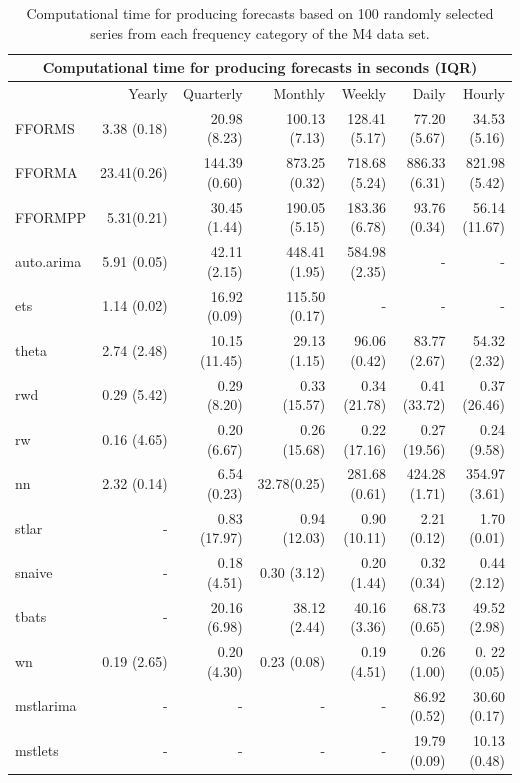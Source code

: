 \documentclass{monashthesis}
\begin{document}
\begin{table}[!h]
\centering\scriptsize\tabcolsep=0.12cm
\caption{Computational time for producing forecasts based on 100 randomly selected series from each frequency category of the M4 data set.}
\label{forecasttime}
{\color{black}\begin{tabular}{l|rrrrrr}
\hline
\multicolumn{7}{c}{Computational time for producing forecasts in seconds (IQR)} \\\hline
 & Yearly & Quarterly & Monthly & Weekly & Daily & Hourly \\\hline
FFORMS & 3.38 (0.18) & 20.98 (8.23)  &  100.13 (7.13) & 128.41 (5.17)  & 77.20 (5.67) & 34.53 (5.16) \\
FFORMA & 23.41(0.26) & 144.39 (0.60)& 873.25 (0.32) & 718.68 (5.24) & 886.33 (6.31) & 821.98 (5.42) \\
FFORMPP & 5.31(0.21) & 30.45 (1.44) & 190.05 (5.15) & 183.36 (6.78) & 93.76 (0.34) & 56.14 (11.67) \\\hline
auto.arima & 5.91 (0.05)  &  42.11 (2.15)& 448.41 (1.95) & 584.98 (2.35) &  -& - \\
ets & 1.14 (0.02) & 16.92 (0.09) & 115.50 (0.17) &  -&-  &  -\\
theta & 2.74 (2.48) & 10.15 (11.45) & 29.13 (1.15) & 96.06 (0.42) & 83.77 (2.67) & 54.32 (2.32) \\
rwd & 0.29 (5.42) & 0.29 (8.20) & 0.33 (15.57)  & 0.34 (21.78)  & 0.41 (33.72)  & 0.37 (26.46) \\
rw & 0.16 (4.65) & 0.20 (6.67) & 0.26 (15.68)   & 0.22 (17.16) &0.27 (19.56)  & 0.24 (9.58)\\
nn & 2.32 (0.14) & 6.54 (0.23) & 32.78(0.25) &281.68 (0.61) & 424.28 (1.71) & 354.97 (3.61) \\
stlar & - & 0.83 (17.97) & 0.94 (12.03) & 0.90 (10.11) & 2.21 (0.12) & 1.70 (0.01) \\
snaive & - & 0.18 (4.51) & 0.30 (3.12) & 0.20 (1.44) & 0.32 (0.34) & 0.44 (2.12) \\
tbats & - & 20.16 (6.98) & 38.12 (2.44) & 40.16 (3.36) & 68.73 (0.65) & 49.52 (2.98) \\
wn & 0.19 (2.65) & 0.20 (4.30) & 0.23 (0.08) & 0.19 (4.51) & 0.26 (1.00) & 0. 22 (0.05) \\
mstlarima & - & - &  - & - & 86.92 (0.52) & 30.60 (0.17) \\
mstlets & - &  - &  - &  - & 19.79 (0.09) & 10.13 (0.48)\\\hline
\end{tabular}}
\end{table}
\end{document}
